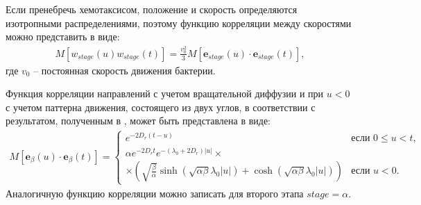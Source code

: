 Если пренебречь хемотаксисом, положение и скорость определяются изотропными распределениями, поэтому функцию корреляции между скоростями можно представить в виде:
\begin{equation}
    \begin{aligned}
        M[w_{stage}(u)w_{stage}(t)]=\frac{v_0^2}{3} M[\textbf{e}_{stage}(u) \cdot \textbf{e}_{stage}(t)],
    \label{eq:speed-correlation-function}
    \end{aligned}
\end{equation}
где $v_0$ -- постоянная скорость движения бактерии.

Функция корреляции направлений с учетом вращательной диффузии и при $u < 0$ с учетом паттерна движения, состоящего из двух углов, в соответствии с результатом, полученным в \cite{taktikos_how_2013}, может быть представлена в виде:
\begin{equation}
    \begin{aligned}
        M[\textbf{e}_{\beta}(u) \cdot \textbf{e}_{\beta}(t)] = 
        \begin{cases}
            e^{-2D_r(t-u)} & \text{если } 0 \leq u < t, \\
            \alpha e^{-2D_r t} e^{-(\lambda_0+2D_r)|u|} \times \\ 
            \times \left ( \sqrt{\frac{\beta}{\alpha}} \sinh (\sqrt{\alpha \beta} \lambda_0 |u|) + \cosh(\sqrt{\alpha \beta} \lambda_0 |u|) \right ) & \text{если } u < 0.
        \end{cases}        
    \label{eq:direction-correlation-function}
    \end{aligned}
\end{equation}
Аналогичную функцию корреляции можно записать для второго этапа $stage=\alpha$.

